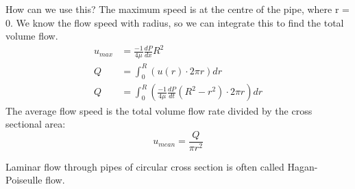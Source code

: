 \documentclass[class=report, crop=false, 12pt,a4paper]{standalone}
\begin{document}
How can we use this? The maximum speed is at the centre of the pipe, where r = 0. We know the flow speed with radius, so we can integrate this to find the total volume flow.
\begin{align*}
  u_{max} &= \frac{-1}{4\mu}\frac{dP}{dx} R^2\\
  Q &= \int^R_0 \left( u(r)\cdot 2\pi r \right) dr\\
  Q &= \int^R_0 \left( \frac{-1}{4\mu} \frac{dP}{dt}(R^2 - r^2) \cdot 2\pi r \right) dr 
\end{align*}
The average flow speed is the total volume flow rate divided by the cross sectional area:
\[ u_{mean} = \frac{Q}{\pi r^2} \]
\begin{center}
  Laminar flow through pipes of circular cross section is often called Hagan-Poiseulle flow.
\end{center}
\end{document}

